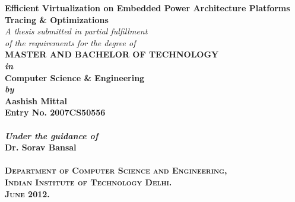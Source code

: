 \begin{titlepage}
\begin{center}

\LARGE{\textsf{\bfseries Efficient Virtualization on Embedded Power Architecture\textsuperscript{\textregistered} Platforms
}}\\
\vspace{20pt}
\LARGE{\textsf{\bfseries Tracing \& Optimizations
}}\\
\vspace{20pt}
\normalsize
\emph{A thesis submitted in partial fulfillment} \\
\emph{of the requirements for the degree of} \\
\vspace{20pt}
\bfseries MASTER AND BACHELOR OF TECHNOLOGY \\
\vspace{20pt}
\emph {in}\\
\vspace{20pt}
\bfseries Computer Science \& Engineering \\
\vspace{20pt}
\emph {by}\\
\vspace{20pt}
\Large{\textsf{\bfseries Aashish Mittal}} \\
{\normalsize \textsf{\bfseries Entry No. 2007CS50556}}\\
\ \\
{\normalsize \emph {Under the guidance of}}
\ \\
\Large{\textsf{\bfseries Dr. Sorav Bansal }} \\
\ \\
\vspace{30pt}
\vspace{10pt}
\large{\textsc{Department of Computer Science and Engineering,\\
Indian Institute of Technology Delhi.\\ June 2012.}}
\end{center}
\end{titlepage}
